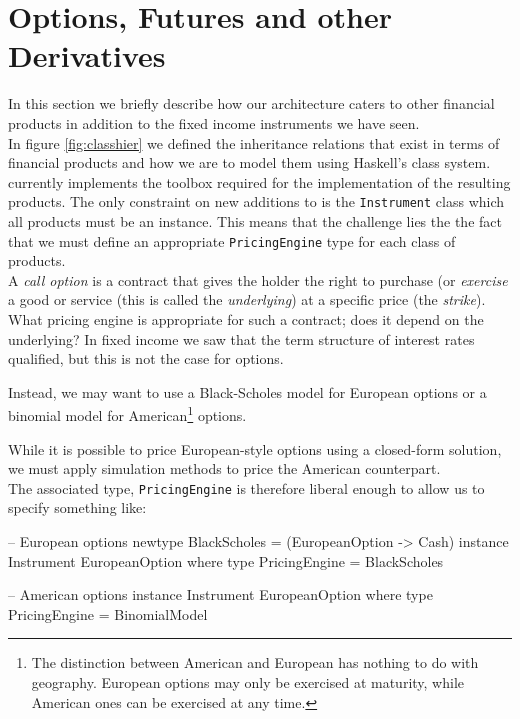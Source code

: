 \section{Options, Futures and other Derivatives}

In this section we briefly describe how our architecture caters to other
financial products in addition to the fixed income instruments we have seen.\\

In figure \ref{fig:classhier} we defined the inheritance relations that
exist in terms of financial products and how we are to model them using 
Haskell's class system. \hql currently implements the toolbox required
for the implementation of the resulting products. The only constraint on
new additions to \hql is the \texttt{Instrument} class which all products
must be an instance. This means that the challenge lies the the fact
that we must define an appropriate \texttt{PricingEngine} type for each
class of products.\\

A \emph{call option} is a contract that gives the holder the right to purchase
(or \emph{exercise} a good or service (this is called the \emph{underlying}) 
at a specific price (the \emph{strike}). What pricing engine is appropriate 
for such a contract; does it depend on the underlying?
In fixed income we saw that the term structure of interest rates qualified,
but this is not the case for options.

Instead, we may want to use a Black-Scholes model for European
options\cite{cmunk} or a binomial model for American\footnote{The distinction
between American and European has nothing to do with geography. European
options may only be exercised at maturity, while American ones can be
exercised at any time.} options.

While it is possible to price European-style options using a closed-form 
solution, we must apply simulation methods to price the American counterpart.\\
The associated type, \texttt{PricingEngine} is therefore liberal enough to
allow us to specify something like:

\begin{hscode}
-- European options
newtype BlackScholes = (EuropeanOption -> Cash)
instance Instrument EuropeanOption where
  type PricingEngine = BlackScholes

-- American options
instance Instrument EuropeanOption where
  type PricingEngine = BinomialModel
\end{hscode}

